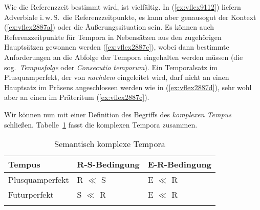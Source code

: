 
Wie die Referenzzeit bestimmt wird, ist vielfältig.
In (\ref{ex:vflex9112}) liefern Adverbiale i.\,w.\,S.\ die Referenzzeitpunkte, es kann aber genausogut der Kontext (\ref{ex:vflex2887a}) oder die Äußerungssituation sein.
Es können auch Referenzzeitpunkte für Tempora in Nebensätzen aus den zugehörigen Hauptsätzen gewonnen werden (\ref{ex:vflex2887c}), wobei dann bestimmte Anforderungen an die Abfolge der Tempora eingehalten werden müssen (die sog.\ \textit{Tempusfolge} oder \textit{Consecutio temporum}).
Ein Temporalsatz im Plusquamperfekt, der von \textit{nachdem} eingeleitet wird, darf \zB nicht an einen Hauptsatz im Präsens angeschlossen werden wie in (\ref{ex:vflex2887d}), sehr wohl aber an einen im Präteritum (\ref{ex:vflex2887c}).

\begin{exe}
  \ex\label{ex:vflex2887b}
  \begin{xlist}
  \end{xlist}
\end{exe}

Wir können nun mit einer Definition des Begriffs des \textit{komplexen Tempus} schließen.
Tabelle~\ref{tab:komplextemp} fasst die komplexen Tempora zusammen.


\begin{table}
  \centering
  \begin{tabular}{lll}
    \lsptoprule
    \textbf{Tempus} & \textbf{R-S-Bedingung} & \textbf{E-R-Bedingung} \\
    \midrule
	Plusquamperfekt & R $\ll$ S & E $\ll$ R \\
	Futurperfekt & S $\ll$ R & E $\ll$ R \\
    \lspbottomrule
  \end{tabular}
  \caption{Semantisch komplexe Tempora}
  \label{tab:komplextemp}
\end{table}

